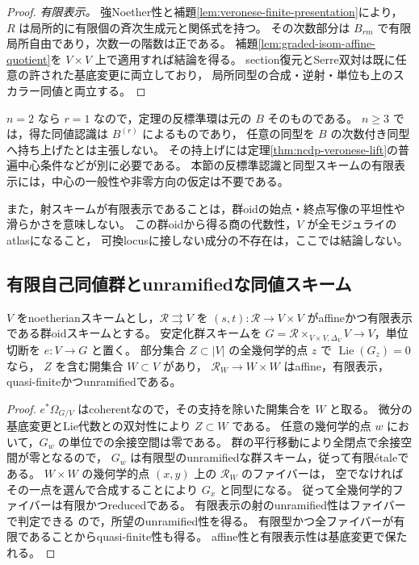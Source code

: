 \begin{proof}
\emph{有限表示。}
強Noether性と補題\ref{lem:veronese-finite-presentation}により，
$R$ は局所的に有限個の斉次生成元と関係式を持つ。
その次数部分は $B_{rm}$ で有限局所自由であり，次数一の階数は正である。
補題\ref{lem:graded-isom-affine-quotient}を $V\times V$ 上で適用すれば結論を得る。
section復元とSerre双対は既に任意の許された基底変更に両立しており，
局所同型の合成・逆射・単位も上のスカラー同値と両立する。
\end{proof}

\begin{remark}[基本シフトとatlasの問題は残る]
$n=2$ なら $r=1$ なので，定理の反標準環は元の $B$ そのものである。
$n\ge3$ では，得た同値認識は $B^{(r)}$ によるものであり，
任意の同型を $B$ の次数付き同型へ持ち上げたとは主張しない。
その持上げには定理\ref{thm:ncdp-veronese-lift}の普遍中心条件などが別に必要である。
本節の反標準認識と同型スキームの有限表示には，中心の一般性や非零方向の仮定は不要である。

また，射スキームが有限表示であることは，群oidの始点・終点写像の平坦性や滑らかさを意味しない。
この群oidから得る商の代数性，$V$ が全モジュライのatlasになること，
可換locusに接しない成分の不存在は，ここでは結論しない。
\end{remark}

\subsection{有限自己同値群とunramifiedな同値スキーム}

\begin{lemma}\label{lem:finite-type-equivalence-unramified-open}
$V$ をnoetherianスキームとし，$\mathcal R\rightrightarrows V$ を
$(s,t):\mathcal R\to V\times V$ がaffineかつ有限表示である群oidスキームとする。
安定化群スキームを
$G=\mathcal R\times_{V\times V,\Delta_V}V\to V$，単位切断を $e:V\to G$ と置く。
部分集合 $Z\subset |V|$ の全幾何学的点 $z$ で $\operatorname{Lie}(G_z)=0$ なら，
$Z$ を含む開集合 $W\subset V$ があり，
$\mathcal R_W\to W\times W$ はaffine，有限表示，quasi-finiteかつunramifiedである。
\end{lemma}
\begin{proof}
$e^*\Omega_{G/V}$ はcoherentなので，その支持を除いた開集合を $W$ と取る。
微分の基底変更とLie代数との双対性により $Z\subset W$ である。
任意の幾何学的点 $w$ において，$G_w$ の単位での余接空間は零である。
群の平行移動により全閉点で余接空間が零となるので，
$G_w$ は有限型のunramifiedな群スキーム，従って有限\'{e}taleである。
$W\times W$ の幾何学的点 $(x,y)$ 上の $\mathcal R_W$ のファイバーは，
空でなければその一点を選んで合成することにより $G_x$ と同型になる。
従って全幾何学的ファイバーは有限かつreducedである。
有限表示の射のunramified性はファイバーで判定できる
\cite[Tags 02G8, 02GF]{StacksProject}ので，所望のunramified性を得る。
有限型かつ全ファイバーが有限であることからquasi-finite性も得る。
affine性と有限表示性は基底変更で保たれる。
\end{proof}


